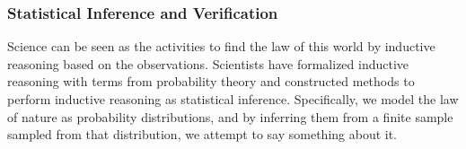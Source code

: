 



\subsubsection{Statistical Inference and Verification}
Science can be seen as the activities to find the law of this world by inductive reasoning based on the observations. Scientists have formalized inductive reasoning with terms from probability theory and constructed methods to perform inductive reasoning as statistical inference. Specifically, we model the law of nature as probability distributions, and by inferring them from a finite sample sampled from that distribution, we attempt to say something about it.


